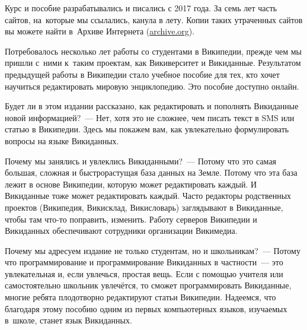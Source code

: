 Курс и пособие разрабатывались и писались с 2017 года. За семь лет часть сайтов, на~которые мы ссылались, канула в лету. 
Копии таких утраченных сайтов вы можете найти в~Архиве Интернета (\href{https://archive.org/}{archive.org}). 

Потребовалось несколько лет работы со студентами в Википедии, прежде чем мы пришли с~ними к~таким проектам, 
как Викиверситет и Викиданные. 
Результатом предыдущей работы в Википедии стало учебное пособие для тех, 
кто хочет научиться редактировать мировую энциклопедию. 
Это пособие доступно онлайн. 




Будет ли в этом издании рассказано, 
как редактировать и пополнять Викиданные новой информацией?~--- Нет, 
хотя это не сложнее, чем писать текст в SMS или статью в Википедии. 
Здесь мы покажем вам, как увлекательно формулировать вопросы на языке Викиданных. 


Почему мы занялись и увлеклись Викиданными?~--- Потому что это самая большая, сложная 
и быстрорастущая база данных на Земле. 
Потому что эта база лежит в основе Википедии, которую может редактировать каждый.
И Викиданные тоже может редактировать каждый. 
Часто редакторы родственных проектов (Википедия, Викисклад, Викисловарь) 
заглядывают в Викиданные, чтобы там что-то поправить, изменить. 
Работу серверов Википедии и Викиданных обеспечивают сотрудники организации Викимедиа. 


Почему мы адресуем издание не только студентам, но и школьникам?~--- Потому что 
программирование и программирование Викиданных в частности~--- это 
увлекательная и, если увлечься, простая вещь. 
Если с помощью учителя или самостоятельно школьник увлечётся, 
то сможет программировать Викиданные, 
многие ребята плодотворно редактируют статьи Википедии. 
Надеемся, что благодаря этому пособию одним из первых компьютерных языков, 
изучаемых в~школе, станет язык Викиданных.



